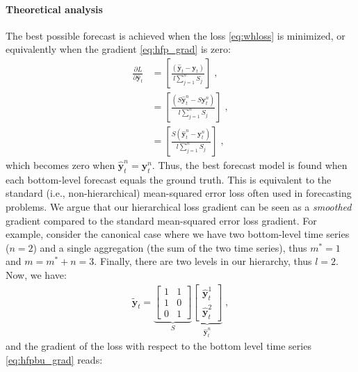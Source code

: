 \documentclass[preprint, 3p, times, twocolumn]{elsarticle}
\begin{document}
\paragraph{Theoretical analysis} The best possible forecast is achieved when the loss \eqref{eq:whloss} is minimized, or equivalently when the gradient \eqref{eq:hfp_grad} is zero:
\begin{align} 
  \frac{\partial L}{\partial \hat{\textbf{y}}_{t}} &=  \left[ \frac{(\hat{\textbf{y}}_{t} - \textbf{y}_{t})}{l \sum_{j=1}^n S_{j}} \right] \;, \nonumber \\
                                                   &=  \left[ \frac{(S \hat{\textbf{y}}^n_{t} - S \textbf{y}^n_{t})}{l \sum_{j=1}^n S_{j}} \right] \;, \nonumber \\
                                                   &=  \left[ \frac{S(\hat{\textbf{y}}^n_{t} - \textbf{y}^n_{t})}{l \sum_{j=1}^n S_{j}} \right] \;, \nonumber
\end{align}
which becomes zero when \(\hat{\textbf{y}}^n_{t} = \textbf{y}^n_{t}\). Thus, the best forecast model is found when each bottom-level forecast equals the ground truth. This is equivalent to the standard (i.e., non-hierarchical) mean-squared error loss often used in forecasting problems. We argue that our hierarchical loss gradient can be seen as a \textit{smoothed} gradient compared to the standard mean-squared error loss gradient. For example, consider the canonical case where we have two bottom-level time series (\(n=2\)) and a single aggregation (the sum of the two time series), thus \(m^* = 1\) and \(m = m^* + n = 3\). Finally, there are two levels in our hierarchy, thus \(l = 2\). Now, we have:
\begin{align}
  \tilde{\textbf{y}}_{t} = \underbrace{
    \begin{bmatrix}
    1 &1 \\
    1 &0 \\
    0 &1
    \end{bmatrix}}_S 
    \underbrace{    
    \begin{bmatrix}
      \hat{\textbf{y}}^1_{t} \\
      \hat{\textbf{y}}^2_{t}
    \end{bmatrix}}_{\hat{\textbf{y}}^n_{t}} \;,
\end{align}
and the gradient of the loss with respect to the bottom level time series \eqref{eq:hfpbu_grad} reads:
\end{document}
